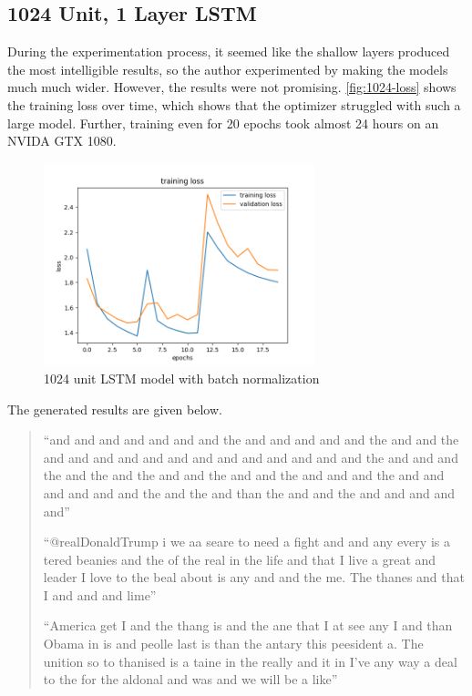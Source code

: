 \documentclass[letterpaper]{article}
\begin{document}
    \subsection{1024 Unit, 1 Layer LSTM}
        During the experimentation process, it seemed like the shallow layers produced the most intelligible results, so the author experimented by making the models much much wider. However, the results were not promising. \autoref{fig:1024-loss} shows the training loss over time, which shows that the optimizer struggled with such a large model. Further, training even for 20 epochs took almost 24 hours on an NVIDA GTX 1080.

        \begin{figure}[h]
            \centering
            \includegraphics[width=0.7\textwidth]{figures/1024-rms-batchnorm-20.png}
            \caption{1024 unit LSTM model with batch normalization}\label{fig:1024-loss}
        \end{figure}

        The generated results are given below.

        \begin{quote}
            ``and and and and and and and the and and and and and the and and the and and and and and and and and and and and and and the and and and the and the and the and and the and and the and and and the and and and and and and the and the and than the and and the and and and and and''

            ``@realDonaldTrump i we aa seare to need a fight and and any every is a tered beanies and the of the real in the life and that I live a great and leader I love to the beal about is any and and the me. The thanes and that I and and and lime''

            ``America get I and the thang is and the ane that I at see any I and than Obama in is and peolle last is than the antary this peesident a. The unition so to thanised is a taine in the really and it in I've any way a deal to the for the aldonal and was and we will be a like''
        \end{quote}
\end{document}

